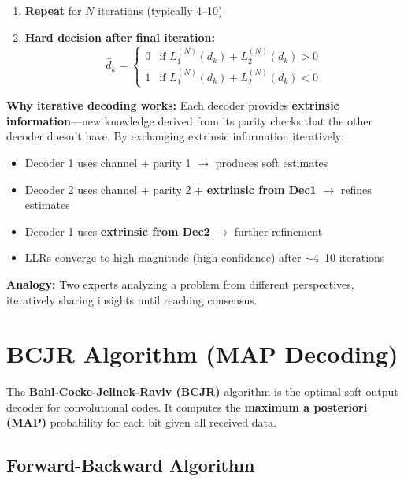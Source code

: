 \begin{enumerate}
\item \textbf{Repeat} for $N$ iterations (typically 4--10)

\item \textbf{Hard decision after final iteration:}
  \begin{equation}
  \hat{d}_k = \begin{cases}
  0 & \text{if } L_1^{(N)}(d_k) + L_2^{(N)}(d_k) > 0 \\
  1 & \text{if } L_1^{(N)}(d_k) + L_2^{(N)}(d_k) < 0
  \end{cases}
  \label{eq:hard-decision}
  \end{equation}
\end{enumerate}

\begin{keyconcept}
\textbf{Why iterative decoding works:} Each decoder provides \textbf{extrinsic information}---new knowledge derived from its parity checks that the other decoder doesn't have. By exchanging extrinsic information iteratively:
\begin{itemize}
\item Decoder 1 uses channel + parity 1 $\rightarrow$ produces soft estimates
\item Decoder 2 uses channel + parity 2 + \textbf{extrinsic from Dec1} $\rightarrow$ refines estimates
\item Decoder 1 uses \textbf{extrinsic from Dec2} $\rightarrow$ further refinement
\item LLRs converge to high magnitude (high confidence) after $\sim$4--10 iterations
\end{itemize}

\textbf{Analogy:} Two experts analyzing a problem from different perspectives, iteratively sharing insights until reaching consensus.
\end{keyconcept}

\section{BCJR Algorithm (MAP Decoding)}

The \textbf{Bahl-Cocke-Jelinek-Raviv (BCJR)} algorithm is the optimal soft-output decoder for convolutional codes. It computes the \textbf{maximum a posteriori (MAP)} probability for each bit given all received data.

\subsection{Forward-Backward Algorithm}

